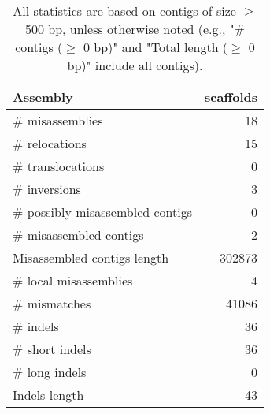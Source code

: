 \documentclass[12pt,a4paper]{article}
\begin{document}
\begin{table}[ht]
\begin{center}
\caption{All statistics are based on contigs of size $\geq$ 500 bp, unless otherwise noted (e.g., "\# contigs ($\geq$ 0 bp)" and "Total length ($\geq$ 0 bp)" include all contigs).}
\begin{tabular}{|l*{1}{|r}|}
\hline
Assembly & scaffolds \\ \hline
\# misassemblies & 18 \\ \hline
\hspace{5mm}\# relocations & 15 \\ \hline
\hspace{5mm}\# translocations & 0 \\ \hline
\hspace{5mm}\# inversions & 3 \\ \hline
\# possibly misassembled contigs & 0 \\ \hline
\# misassembled contigs & 2 \\ \hline
Misassembled contigs length & 302873 \\ \hline
\# local misassemblies & 4 \\ \hline
\# mismatches & 41086 \\ \hline
\# indels & 36 \\ \hline
\hspace{5mm}\# short indels & 36 \\ \hline
\hspace{5mm}\# long indels & 0 \\ \hline
Indels length & 43 \\ \hline
\end{tabular}
\end{center}
\end{table}
\end{document}
